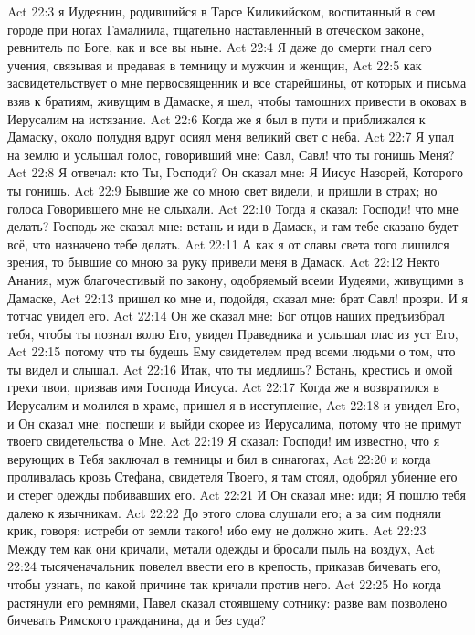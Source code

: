 \vs Act 22:3 я Иудеянин, родившийся в Тарсе Киликийском, воспитанный в сем городе при ногах Гамалиила, тщательно наставленный в отеческом законе, ревнитель по Боге, как и все вы ныне.
\vs Act 22:4 Я даже до смерти гнал  сего учения, связывая и предавая в темницу и мужчин и женщин,
\vs Act 22:5 как засвидетельствует о мне первосвященник и все старейшины, от которых и письма взяв к братиям, живущим в Дамаске, я шел, чтобы тамошних привести в оковах в Иерусалим на истязание.
\vs Act 22:6 Когда же я был в пути и приближался к Дамаску, около полудня вдруг осиял меня великий свет с неба.
\vs Act 22:7 Я упал на землю и услышал голос, говоривший мне: Савл, Савл! что ты гонишь Меня?
\vs Act 22:8 Я отвечал: кто Ты, Господи? Он сказал мне: Я Иисус Назорей, Которого ты гонишь.
\vs Act 22:9 Бывшие же со мною свет видели, и пришли в страх; но голоса Говорившего мне не слыхали.
\vs Act 22:10 Тогда я сказал: Господи! что мне делать? Господь же сказал мне: встань и иди в Дамаск, и там тебе сказано будет всё, что назначено тебе делать.
\vs Act 22:11 А как я от славы света того лишился зрения, то бывшие со мною за руку привели меня в Дамаск.
\vs Act 22:12 Некто Анания, муж благочестивый по закону, одобряемый всеми Иудеями, живущими в Дамаске,
\vs Act 22:13 пришел ко мне и, подойдя, сказал мне: брат Савл! прозри. И я тотчас увидел его.
\vs Act 22:14 Он же сказал мне: Бог отцов наших предъизбрал тебя, чтобы ты познал волю Его, увидел Праведника и услышал глас из уст Его,
\vs Act 22:15 потому что ты будешь Ему свидетелем пред всеми людьми о том, что ты видел и слышал.
\vs Act 22:16 Итак, что ты медлишь? Встань, крестись и омой грехи твои, призвав имя Господа Иисуса.
\vs Act 22:17 Когда же я возвратился в Иерусалим и молился в храме, пришел я в исступление,
\vs Act 22:18 и увидел Его, и Он сказал мне: поспеши и выйди скорее из Иерусалима, потому что  не примут твоего свидетельства о Мне.
\vs Act 22:19 Я сказал: Господи! им известно, что я верующих в Тебя заключал в темницы и бил в синагогах,
\vs Act 22:20 и когда проливалась кровь Стефана, свидетеля Твоего, я там стоял, одобрял убиение его и стерег одежды побивавших его.
\vs Act 22:21 И Он сказал мне: иди; Я пошлю тебя далеко к язычникам.
\rsbpar\vs Act 22:22 До этого слова слушали его; а за сим подняли крик, говоря: истреби от земли такого! ибо ему не должно жить.
\vs Act 22:23 Между тем как они кричали, метали одежды и бросали пыль на воздух,
\vs Act 22:24 тысяченачальник повелел ввести его в крепость, приказав бичевать его, чтобы узнать, по какой причине так кричали против него.
\vs Act 22:25 Но когда растянули его ремнями, Павел сказал стоявшему сотнику: разве вам позволено бичевать Римского гражданина, да и без суда?
